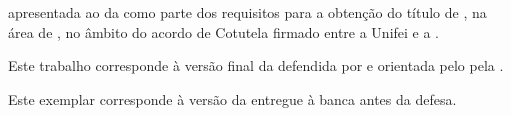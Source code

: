 \makeatletter
  \begin{center}
    \large\bfseries
    \@UNIFEI \\
    \@UNIDADEENSINO
  \end{center}
  \vfill
  \begin{center}
    \large\bfseries
    \if\@autora\relax\@autor\else\@autora\fi
  \vfill
    \@titulo
    \ifx\@subtitulo\relax\else
      \\[0.5cm]
      \normalfont
      \@subtitulo
    \fi
  \end{center}
  \vfill
  \normalfont\normalsize
  \hfill
  \begin{minipage}[t]{0.54\textwidth}
    \suppresshyphens
    \@monopt\xspace apresentada ao \@UNIDADEENSINO{} da \@UNIFEI{} como parte dos requisitos para a obtenção do título de \@degnamept\xspace \ifx\@areaConcentracao\relax\else, na área de \@areaConcentracao\fi \ifx\@cotutela\relax\else\xspace, no âmbito do acordo de Cotutela firmado entre a Unifei e a \@cotutela\fi.
  \end{minipage}
  \vfill
  \if\@orientadora{}
  \fi
  \ifnum{}
    \par\addvspace{1em}
    \if\@coorientadora{}
    \fi
  \fi
  \vfill
  \iffinalversion
    \begin{minipage}[t]{0.5\textwidth}
      \suppresshyphens
      Este trabalho corresponde à versão final da \@monopt\xspace defendida por
      \if\@autora\relax\@autor\else\@autora\fi\xspace e orientada
      \if\@orientadora\relax pelo \@orientador\else pela \@orientadora\fi.
    \end{minipage}
  \else
    \begin{minipage}[t]{0.5\textwidth}
      \suppresshyphens
      Este exemplar corresponde à versão da \@monopt\xspace entregue
      à banca antes da defesa.
    \end{minipage}
  \fi
  \vfill
  \begin{center}
    \large
    \@CIDADE\\ \@ano
  \end{center}
\makeatother